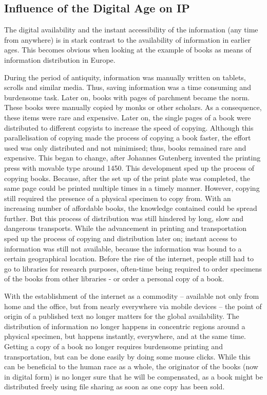 \documentclass[a4paper]{report}
\begin{document}
\subsection{Influence of the Digital Age on IP}
The digital availability and the instant accessibility of the information (any time from anywhere) is in stark contrast to the availability of information in earlier ages. This becomes obvious when looking at the example of books as means of information distribution in Europe.

During the period of antiquity, information was manually written on tablets, scrolls and similar media. Thus, saving information was a time consuming and burdensome task.  Later on, books with pages of parchment became the norm. These books were manually copied by monks or other scholars. As a consequence, these items were rare and expensive. Later on, the single pages of a book were distributed to different copyists to increase the speed of copying. Although this parallelisation of copying made the process of copying a book faster, the effort used was only distributed and not minimised; thus, books remained rare and expensive. This began to change, after Johannes Gutenberg invented the printing press with movable type around 1450. This development sped up the process of copying books. Because, after the set up of the print plate was completed, the same page could be printed multiple times in a timely manner. However, copying still required the presence of a physical specimen to copy from. With an increasing number of affordable books, the knowledge contained could be spread further. But this process of distribution was still hindered by long, slow and dangerous transports. While the advancement in printing and transportation sped up the process of copying and distribution later on; instant access to information was still not available, because the information was bound to a certain geographical location. Before the rise of the internet, people still had to go to libraries for research purposes, often-time being required to order specimens of the books from other libraries - or order a personal copy of a book.

With the establishment of the internet as a commodity -- available not only from home and the office, but from nearly everywhere via mobile devices -- the point of origin of a published text no longer matters for the global availability. The distribution of information no longer happens in concentric regions around a physical specimen, but happens instantly, everywhere, and at the same time. Getting a copy of a book no longer requires burdensome printing and transportation, but can be done easily by doing some mouse clicks. While this can be beneficial to the human race as a whole, the originator of the books (now in digital form) is no longer sure that he will be compensated, as a book might be distributed freely using file sharing as soon as one copy has been sold.
\end{document}
